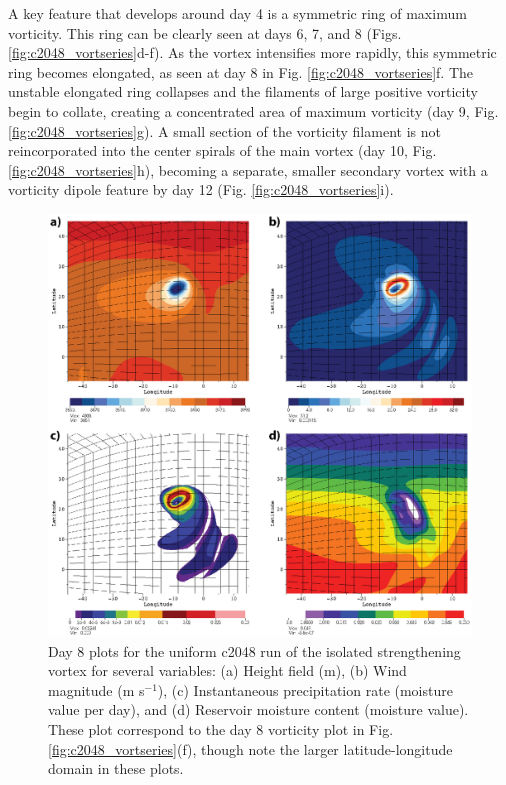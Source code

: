    A key feature that 
   develops around day 4 is a symmetric ring of maximum vorticity. This ring can be clearly 
   seen at days 6, 7, and 8 (Figs. \ref{fig:c2048_vortseries}d-f). As the vortex intensifies more rapidly, this symmetric ring becomes elongated, as
   seen at day 8 in Fig. \ref{fig:c2048_vortseries}f. The unstable elongated ring 
   collapses and the filaments of large positive vorticity begin to collate,
   creating a concentrated area of maximum vorticity (day 9, Fig. \ref{fig:c2048_vortseries}g). 
   A small section of the vorticity filament is not reincorporated into the center spirals
   of the main vortex (day 10, Fig. \ref{fig:c2048_vortseries}h), becoming a separate,
   smaller secondary vortex with a vorticity dipole feature by 
   day 12 (Fig. \ref{fig:c2048_vortseries}i).

\begin{figure}
    \centerline{%
    \noindent
    \includegraphics[width=\textwidth]{Chap2/c2048_day8_plots-01.eps}}
   \caption{Day 8 plots for the uniform c2048 run of the isolated strengthening vortex for several variables: 
   (a) Height field (m), (b) Wind magnitude (m s$^{-1}$), (c) Instantaneous precipitation rate (moisture value per day), 
   and (d) Reservoir moisture content (moisture value).
   These plot correspond to the day 8 vorticity plot in Fig. \ref{fig:c2048_vortseries}(f), though
    note the larger latitude-longitude domain in these plots. }%
    \label{fig:c2048_day8}
\end{figure}
    
